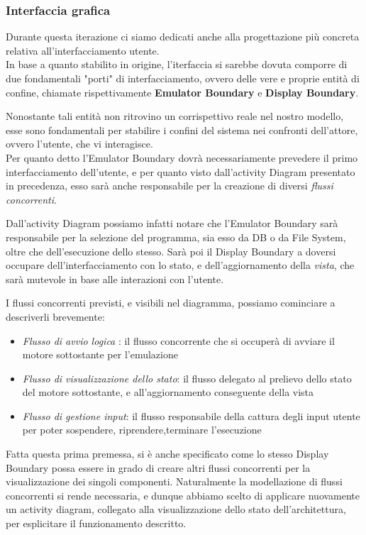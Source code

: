 \documentclass[11pt]{article}
\begin{document}
\subsubsection{Interfaccia grafica}
Durante questa iterazione ci siamo dedicati anche alla progettazione più concreta relativa all'interfacciamento utente.\\
In base a quanto stabilito in origine, l'iterfaccia si sarebbe dovuta comporre di due fondamentali "porti" di interfacciamento, ovvero delle vere e proprie entità di confine, chiamate rispettivamente \textbf{Emulator Boundary} e \textbf{Display Boundary}.

Nonostante tali entità non ritrovino un corrispettivo reale nel nostro modello, esse sono fondamentali per stabilire i confini del sistema nei confronti dell'attore, ovvero l'utente, che vi interagisce.\\
Per quanto detto l'Emulator Boundary dovrà necessariamente prevedere il primo interfacciamento dell'utente, e per quanto visto dall'activity Diagram presentato in precedenza, esso sarà anche responsabile per la creazione di diversi \emph{flussi concorrenti}.

Dall'activity Diagram possiamo infatti notare che l'Emulator Boundary sarà responsabile per la selezione del programma, sia esso da DB o da File System, oltre che dell'esecuzione dello stesso. Sarà poi il Display Boundary a doversi occupare dell'interfacciamento con lo stato, e dell'aggiornamento della \emph{vista}, che sarà mutevole in base alle interazioni con l'utente.

I flussi concorrenti previsti, e visibili nel diagramma, possiamo cominciare a descriverli brevemente:

\begin{itemize}
	\item{
		\emph{Flusso di avvio logica} : il flusso concorrente che si occuperà di avviare il motore sottostante per l'emulazione
	}
	\item{
		\emph{Flusso di visualizzazione dello stato}: il flusso delegato al prelievo dello stato del motore sottostante, e all'aggiornamento conseguente della vista
	}
	\item{
		\emph{Flusso di gestione input}: il flusso responsabile della cattura degli input utente per poter sospendere, riprendere,terminare l'esecuzione
	}
\end{itemize}

Fatta questa prima premessa, si è anche specificato come lo stesso Display Boundary possa essere in grado di creare altri flussi concorrenti per la visualizzazione dei singoli componenti. 
Naturalmente la modellazione di flussi concorrenti si rende necessaria, e dunque abbiamo scelto di applicare nuovamente un activity diagram, collegato alla visualizzazione dello stato dell'architettura, per esplicitare il funzionamento descritto.
\end{document}
